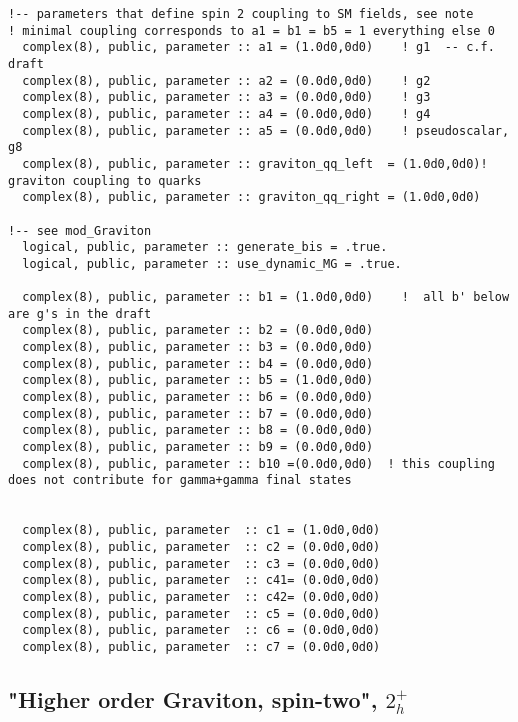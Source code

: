 \documentclass[aps,superscriptaddress,nofootinbib]{revtex4}
\begin{document}
\footnotesize
\begin{verbatim}
!-- parameters that define spin 2 coupling to SM fields, see note
! minimal coupling corresponds to a1 = b1 = b5 = 1 everything else 0
  complex(8), public, parameter :: a1 = (1.0d0,0d0)    ! g1  -- c.f. draft
  complex(8), public, parameter :: a2 = (0.0d0,0d0)    ! g2
  complex(8), public, parameter :: a3 = (0.0d0,0d0)    ! g3
  complex(8), public, parameter :: a4 = (0.0d0,0d0)    ! g4
  complex(8), public, parameter :: a5 = (0.0d0,0d0)    ! pseudoscalar, g8
  complex(8), public, parameter :: graviton_qq_left  = (1.0d0,0d0)! graviton coupling to quarks
  complex(8), public, parameter :: graviton_qq_right = (1.0d0,0d0)

!-- see mod_Graviton
  logical, public, parameter :: generate_bis = .true.
  logical, public, parameter :: use_dynamic_MG = .true.

  complex(8), public, parameter :: b1 = (1.0d0,0d0)    !  all b' below are g's in the draft
  complex(8), public, parameter :: b2 = (0.0d0,0d0)
  complex(8), public, parameter :: b3 = (0.0d0,0d0)
  complex(8), public, parameter :: b4 = (0.0d0,0d0)
  complex(8), public, parameter :: b5 = (1.0d0,0d0)
  complex(8), public, parameter :: b6 = (0.0d0,0d0)
  complex(8), public, parameter :: b7 = (0.0d0,0d0)
  complex(8), public, parameter :: b8 = (0.0d0,0d0)
  complex(8), public, parameter :: b9 = (0.0d0,0d0)
  complex(8), public, parameter :: b10 =(0.0d0,0d0)  ! this coupling does not contribute for gamma+gamma final states


  complex(8), public, parameter  :: c1 = (1.0d0,0d0)
  complex(8), public, parameter  :: c2 = (0.0d0,0d0)
  complex(8), public, parameter  :: c3 = (0.0d0,0d0)
  complex(8), public, parameter  :: c41= (0.0d0,0d0)
  complex(8), public, parameter  :: c42= (0.0d0,0d0)
  complex(8), public, parameter  :: c5 = (0.0d0,0d0)
  complex(8), public, parameter  :: c6 = (0.0d0,0d0)
  complex(8), public, parameter  :: c7 = (0.0d0,0d0)
\end{verbatim}
\normalsize

\subsection{"Higher order Graviton, spin-two", $2^+_h$}
\end{document}
